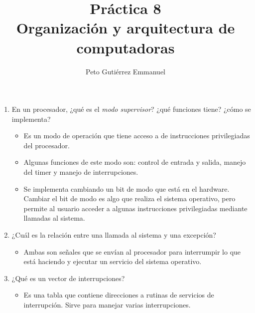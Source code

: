 \documentclass{article}
\title{Práctica 8 \\ Organización y arquitectura de computadoras}
\author{Peto Gutiérrez Emmanuel}
\begin{document}
\maketitle
\begin{enumerate}[1.]
\item En un procesador, ¿qué es el \textit{modo supervisor}? ¿qué funciones tiene? ¿cómo se implementa?
	\begin{itemize}
	\item Es un modo de operación que tiene acceso a de instrucciones privilegiadas del procesador.
	\item Algunas funciones de este modo son: control de entrada y salida, manejo del timer y manejo de interrupciones.
	\item Se implementa cambiando un bit de modo que está en el hardware. Cambiar el bit de modo es algo que realiza el sistema operativo, pero permite al usuario acceder a algunas instrucciones privilegiadas mediante llamadas al sistema.
	\end{itemize}
\item ¿Cuál es la relación entre una llamada al sistema y una excepción?
	\begin{itemize}
	\item Ambas son señales que se envían al procesador para interrumpir lo que está haciendo y ejecutar un servicio del sistema operativo.
	\end{itemize}
\item ¿Qué es un vector de interrupciones?
	\begin{itemize}
	\item Es una tabla que contiene direcciones a rutinas de servicios de interrupción. Sirve para manejar varias interrupciones.
	\end{itemize}
\end{enumerate}
\end{document}
